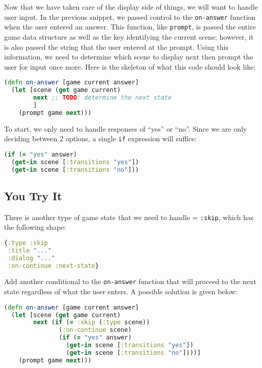 \documentclass[10pt,twoside,openright]{memoir}
\begin{document}
Now that we have taken care of the display side of things, we will want
to handle user input. In the previous snippet, we passed control to the
\texttt{on-answer} function when the user entered an answer. This
function, like \texttt{prompt}, is passed the entire game data structure
as well as the key identifying the current scene; however, it is also
passed the string that the user entered at the prompt. Using this
information, we need to determine which scene to display next then
prompt the user for input once more. Here is the skeleton of what this
code should look like:

\begin{lstlisting}[language=Clojure]
(defn on-answer [game current answer]
  (let [scene (get game current)
        next ;; TODO: determine the next state
        ]
    (prompt game next)))
\end{lstlisting}

To start, we only need to handle responses of ``yes'' or ``no''. Since
we are only deciding between 2 options, a single \texttt{if} expression
will suffice:

\begin{lstlisting}[language=Clojure]
(if (= "yes" answer)
  (get-in scene [:transitions "yes"])
  (get-in scene [:transitions "no"]))
\end{lstlisting}

\subsection{You Try It}

There is another type of game state that we need to handle =
\texttt{:skip}, which has the following shape:

\begin{lstlisting}[language=Clojure]
{:type :skip
 :title "..."
 :dialog "..."
 :on-continue :next-state}
\end{lstlisting}

Add another conditional to the \texttt{on-answer} function that will
proceed to the next state regardless of what the user enters. A possible
solution is given below:

\begin{lstlisting}[language=Clojure]
(defn on-answer [game current answer]
  (let [scene (get game current)
        next (if (= :skip (:type scene))
               (:on-continue scene)
               (if (= "yes" answer)
                 (get-in scene [:transitions "yes"])
                 (get-in scene [:transitions "no"])))]
    (prompt game next)))
\end{lstlisting}
\end{document}
